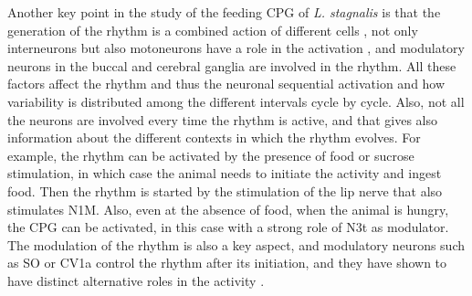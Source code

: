 Another key point in the study of the feeding CPG of \textit{L. stagnalis} is that the generation of the rhythm is a combined action of different cells \parencite{benjamin_distributed_2012}, not only interneurons but also motoneurons have a role in the activation \parencite{staras_pattern-generating_1998}, and modulatory neurons in the buccal and cerebral ganglia are involved in the rhythm. All these factors affect the rhythm and thus the neuronal sequential activation and how variability is distributed among the different intervals cycle by cycle. Also, not all the neurons are involved every time the rhythm is active, and that gives also information about the different contexts in which the rhythm evolves. For example, the rhythm can be activated by the presence of food or sucrose stimulation, in which case the animal needs to initiate the activity and ingest food. Then the rhythm is started by the stimulation of the lip nerve that also stimulates N1M. Also, even at the absence of food, when the animal is hungry, the CPG can be activated, in this case with a strong role of N3t as modulator. The modulation of the rhythm is also a key aspect, and modulatory neurons such as SO or CV1a control the rhythm after its initiation, and they have shown to have distinct alternative roles in the activity \parencite{kemenes_multiple_2001}. 

